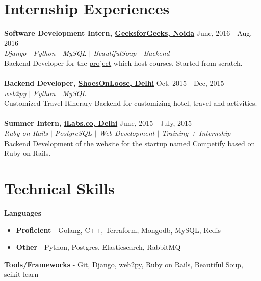\documentclass[margin, centered]{res}
\begin{document}
\begin{resume}
\section{Internship Experiences}
\textbf{Software Development Intern, \href{http://www.geeksforgeeks.org}{GeeksforGeeks, Noida}} \hfill June, 2016 - Aug, 2016\\
\emph{\color{BlueViolet}Django $\vert$ Python $\vert$ MySQL $\vert$ BeautifulSoup $\vert$ Backend}  \\
Backend Developer for the \href{http://courses.geeksforgeeks.org}{project} which host courses. Started from scratch.  \\
\\
\textbf{Backend Developer, \href {http://shoesonloose.com/}{ShoesOnLoose, Delhi}} \hfill Oct, 2015 - Dec, 2015 \\
\emph{\color{BlueViolet}web2py $\vert$ Python $\vert$ MySQL} \\
Customized Travel Itinerary Backend for customizing hotel, travel and activities. \\
\\
\textbf{Summer Intern, \href{http://www.ilabs.co}{iLabs.co, Delhi}} \hfill June, 2015 - July, 2015 \\
\emph{\color{BlueViolet}Ruby on Rails $\vert$ PostgreSQL $\vert$ Web Development $\vert$ Training + Internship} \\
Backend Development of the website for the startup named \href {http://competifyin.herokuapp.com} {Competify} based on Ruby on Rails. 
\section{Technical \hspace{2mm} Skills}
\textbf{Languages}
\begin{itemize}
	\item \textbf{Proficient} - Golang, C++, Terraform, Mongodb, MySQL, Redis
	\item \textbf{Other} -  Python, Postgres, Elasticsearch, RabbitMQ
\end{itemize} 
\textbf{Tools/Frameworks} - Git, Django, web2py, Ruby on Rails, Beautiful Soup, scikit-learn


\end{resume}
\end{document}
